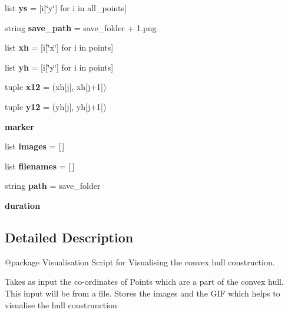 \begin{DoxyCompactItemize}
\item 
\mbox{\label{namespaceviz_aba10e6cb35ce6bb5bcda964ee5424709}} 
list {\bfseries ys} = \mbox{[}i\mbox{[}\char`\"{}y\char`\"{}\mbox{]} for i in all\+\_\+points\mbox{]}
\item 
\mbox{\label{namespaceviz_ad500652a6dbdadf872bcc16c06a7f1f2}} 
string {\bfseries save\+\_\+path} = save\+\_\+folder + \textquotesingle{}1.png\textquotesingle{}
\item 
\mbox{\label{namespaceviz_a971927fa13e910d3dcce3005307e5d80}} 
list {\bfseries xh} = \mbox{[}i\mbox{[}\char`\"{}x\char`\"{}\mbox{]} for i in points\mbox{]}
\item 
\mbox{\label{namespaceviz_a4ab48a56189b66079b219e65a50e8f5f}} 
list {\bfseries yh} = \mbox{[}i\mbox{[}\char`\"{}y\char`\"{}\mbox{]} for i in points\mbox{]}
\item 
\mbox{\label{namespaceviz_a5154b62dc4f27dd696be2eb29e190510}} 
tuple {\bfseries x12} = (xh\mbox{[}j\mbox{]}, xh\mbox{[}j+1\mbox{]})
\item 
\mbox{\label{namespaceviz_a90b8e0262d8da637b8c73c32436c463f}} 
tuple {\bfseries y12} = (yh\mbox{[}j\mbox{]}, yh\mbox{[}j+1\mbox{]})
\item 
\mbox{\label{namespaceviz_a2775352cd2f8e39030d46cccdd6c5bec}} 
{\bfseries marker}
\item 
\mbox{\label{namespaceviz_ae10009cd81d9cc163a3c8be90b7fba9e}} 
list {\bfseries images} = \mbox{[}$\,$\mbox{]}
\item 
\mbox{\label{namespaceviz_a6e3b1ef282af414dc603e69de148d85d}} 
list {\bfseries filenames} = \mbox{[}$\,$\mbox{]}
\item 
\mbox{\label{namespaceviz_a71f94f80afeaf328e723219337010411}} 
string {\bfseries path} = save\+\_\+folder
\item 
\mbox{\label{namespaceviz_afb8dadc1612617718e8c0a507596b2d6}} 
{\bfseries duration}
\end{DoxyCompactItemize}


\subsection{Detailed Description}
\begin{DoxyVerb}@package Visualisation
Script for Visualising the convex hull construction.

Takes as input the co-ordinates of Points which are a part of the convex hull. This input will be from a file.
Stores the images and the GIF which helps to visualise the hull construnction
\end{DoxyVerb}
 